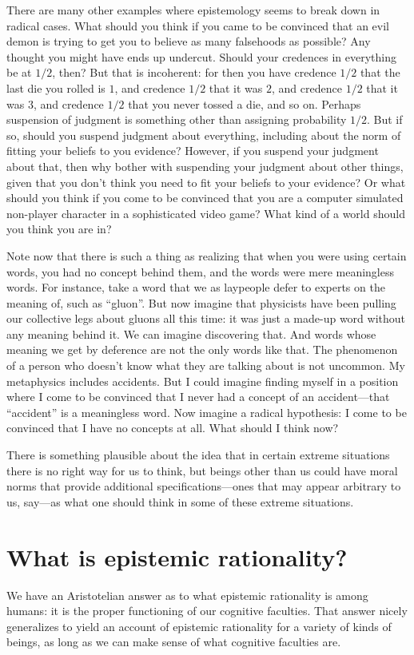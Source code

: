 There are many other examples where epistemology seems to break down in radical cases. What should you think if you came to be
convinced that an evil demon is trying to get you to believe as many falsehoods as possible? Any thought you might have ends
up undercut. Should your credences in everything be at $1/2$, then? But that is incoherent: for then you have credence $1/2$
that the last die you rolled is $1$, and credence $1/2$ that it was $2$, and credence $1/2$ that it was $3$, and credence $1/2$
that you never tossed a die, and so on. Perhaps suspension of judgment is something other than assigning probability $1/2$. But 
if so, should you suspend judgment about everything, including about the norm of fitting your beliefs to you evidence? However,
if you suspend your judgment about that, then why bother with suspending your judgment about other things, given that you don't 
think you need to fit your beliefs to your evidence? Or what should you think if you come to be convinced that you are a computer 
simulated non-player character in a sophisticated video game? What kind of a world should you think you are in? 

Note now that there is such a thing as realizing that when you were using certain words, you had no concept behind them, and
the words were mere meaningless words. For instance, take a word that we as laypeople defer to experts on the meaning of, such
as ``gluon''. But now imagine that physicists have been pulling our collective legs about gluons all this time: it was just a 
made-up word without any meaning behind it. We can imagine discovering that. And words whose meaning we get by deference are not
the only words like that. The phenomenon of a person who doesn't know what they are talking about is not uncommon. My metaphysics
includes accidents. But I could imagine finding myself in a position where I come to be convinced that I never had a concept of
an accident---that ``accident'' is a meaningless word. Now imagine a radical hypothesis: I come to be convinced that I have no
concepts at all. What should I think now? 

There is something plausible about the idea that in certain extreme situations there is no right way for us to think,
but beings other than us could have moral norms that provide additional specifications---ones that may appear 
arbitrary to us, say---as what one should think in some of these extreme situations. 

\section{What is epistemic rationality?}
We have an Aristotelian answer as to what epistemic rationality is among humans: it is the proper functioning of 
our cognitive faculties. That answer nicely generalizes to yield an account of epistemic rationality for a variety 
of kinds of beings, as long as we can make sense of what cognitive faculties are. 

